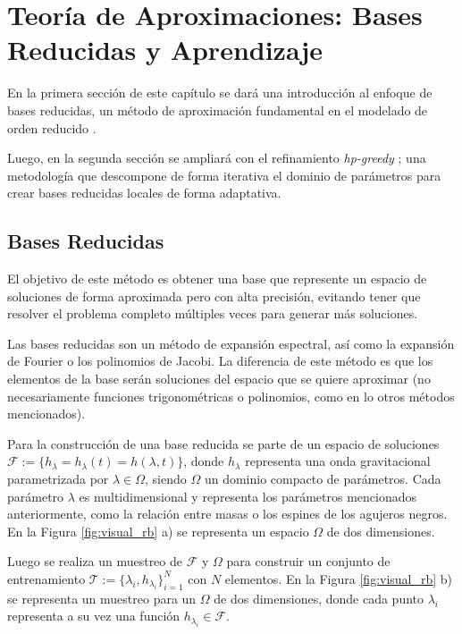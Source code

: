 \chapter{Teoría de Aproximaciones: Bases Reducidas y Aprendizaje}


En la primera sección de este capítulo se dará una introducción al enfoque de bases reducidas, un método de aproximación fundamental en el modelado de orden reducido \cite{Tiglio:2021ysj}. 

Luego, en la segunda sección se ampliará con el refinamiento \textit{hp-greedy} \cite{Cerino:2022dhr}; una metodología que descompone de forma iterativa el dominio de parámetros para crear bases reducidas locales de forma adaptativa.



\section{Bases Reducidas}

El objetivo de este método es obtener una base que represente un espacio de soluciones de forma aproximada pero con alta precisión, evitando tener que resolver el problema completo múltiples veces para generar más soluciones. 


Las bases reducidas son un método de expansión espectral, así como la expansión de Fourier o los polinomios de Jacobi. La diferencia de este método es que los elementos de la base serán soluciones del espacio que se quiere aproximar (no necesariamente funciones trigonométricas o polinomios, como en lo otros métodos mencionados).

Para la construcción de una base reducida se parte de un espacio de soluciones \mbox{$\mathcal{F}:= \{ h_{\lambda} = h_{\lambda}(t) = h(\lambda, t)\}$}, donde $h_{\lambda}$ representa una onda gravitacional parametrizada por $\lambda \in \Omega$, siendo $\Omega$ un dominio compacto de parámetros. Cada parámetro $\lambda$ es multidimensional y representa los parámetros mencionados anteriormente, como la relación entre masas o los espines de los agujeros negros. En la Figura \ref{fig:visual_rb} a) se representa un espacio $\Omega$ de dos dimensiones.

Luego se realiza un muestreo de $\mathcal{F}$ y $\Omega$ para construir un conjunto de entrenamiento $\mathcal{T} := \{\lambda_i, h_{\lambda_i}\}_{i=1}^N$ con $N$ elementos. En la Figura \ref{fig:visual_rb} b) se representa un muestreo para un $\Omega$ de dos dimensiones, donde cada punto $\lambda_i$ representa a su vez una función $h_{\lambda_i} \in \mathcal{F}$.


